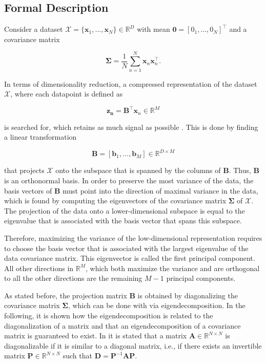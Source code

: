 \documentclass[../../../main.tex]{subfiles}
\begin{document}
\subsection{Formal Description}

Consider a dataset $\mathcal{X} = \{\bm{x}_1, \dots, \bm{x}_N\} \in \mathbb{R}^D$ with mean $\bm{0} = [0_1, \dots, 0_N]^\top$ and a covariance matrix

\begin{equation*}
    \bm{\Sigma} =\frac{1}{N}\sum_{n=1}^N\bm{x}_n\bm{x}_n^\top.
\end{equation*}

In terms of dimensionality reduction, a compressed representation of the dataset $\mathcal{X}$, where each datapoint is defined as

\begin{equation*}
    \bm{z_n} = \bm{B}^\top\bm{x}_n \in \mathbb{R}^M
\end{equation*}

is searched for, which retains as much signal as possible \cite{Hotelling1933AnalysisOA}. This is done by finding a linear transformation

\begin{equation*}
    \bm{B}=[\bm{b}_1, \dots, \bm{b}_M] \in \mathbb{R}^{D\times M}
\end{equation*}

that projects $\mathcal{X}$ onto the subspace that is spanned by the columns of $\bm{B}$. Thus, $\bm{B}$ is an orthonormal basis. In order to preserve the most variance of the data, the basis vectors of $\bm{B}$ must point into the direction of maximal variance in the data, which is found by computing the eigenvectors of the covariance matrix $\bm{\Sigma}$ of $\mathcal{X}$. The projection of the data onto a lower-dimensional subspace is equal to the eigenvalue that is associated with the basis vector that spans this subspace. 

Therefore, maximizing the variance of the low-dimensional representation requires to choose the basis vector that is associated with the largest eigenvalue of the data covariance matrix. This eigenvector is called the first principal component. All other directions in $\mathbb{R}^M$, which both maximize the variance and are orthogonal to all the other directions are the remaining $M-1$ principal components.

As stated before, the projection matrix $\bm{B}$ is obtained by diagonalizing the covariance matrix $\bm{\Sigma}$, which can be done with via eigendecomposition. In the following, it is shown how the eigendecomposition is related to the diagonalization of a matrix and that an eigendecomposition of a covariance matrix is guaranteed to exist. In \cite[98]{dei_2020} it is stated that a matrix $\bm{A} \in \mathbb{R}^{N \times N}$ is diagonalizable if it is similar to a diagonal matrix, i.e., if there exists an invertible matrix $\bm{P} \in \mathbb{R}^{N \times N}$ such that $\bm{D} = \bm{P}^{-1} \bm{A} \bm{P}$.
\end{document}
